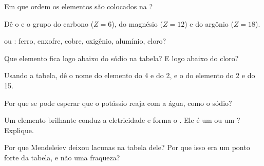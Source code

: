 \begin{exercise}[$\star$]\label{exo:g9:periodic-table-first-look:1}
Em que ordem os elementos são colocados na ?
\end{exercise}

\begin{exercise}[$\star$]\label{exo:g9:periodic-table-first-look:2}
Dê o  e o grupo do carbono ($Z = 6$), do magnésio ($Z = 12$) e
do argônio ($Z = 18$).
\end{exercise}

\begin{exercise}[$\star$]\label{exo:g9:periodic-table-first-look:3}
 ou : ferro, enxofre, cobre, oxigênio, alumínio, cloro?
\end{exercise}

\begin{exercise}[$\star$]\label{exo:g9:periodic-table-first-look:4}
Que elemento fica logo abaixo do sódio na tabela? E logo abaixo do
cloro?
\end{exercise}

\begin{exercise}[$\star\star$]\label{exo:g9:periodic-table-first-look:5}
Usando a tabela, dê o nome do elemento do  4 e do  2, e o do
elemento do  2 e do  15.
\end{exercise}

\begin{exercise}[$\star\star$]\label{exo:g9:periodic-table-first-look:6}
Por que se pode esperar que o potássio reaja com a água, como o sódio?
\end{exercise}

\begin{exercise}[$\star\star$]\label{exo:g9:periodic-table-first-look:7}
Um elemento brilhante conduz a eletricidade e forma o  .
Ele é um  ou um ? Explique.
\end{exercise}

\begin{exercise}[$\star\star$]\label{exo:g9:periodic-table-first-look:8}
Por que Mendeleiev deixou lacunas na tabela dele? Por que isso era um
ponto forte da tabela, e não uma fraqueza?
\end{exercise}

